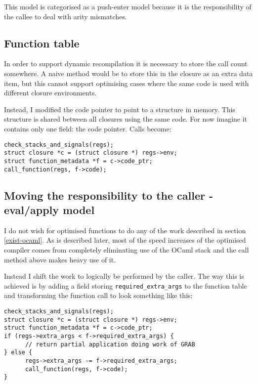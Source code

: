 This model is categorised as a push-enter model because it is the responsibility of the callee to
deal with arity mismatches.

\subsection{Function table}

In order to support dynamic recompilation it is necessary to store the call count somewhere. A
naive method would be to store this in the closure as an extra data item, but this cannot support
optimising cases where the same code is used with different closure environments.

Instead, I modified the code pointer to point to a structure in memory. This structure is shared
between all closures using the same code. For now imagine it contains only one field: the code
pointer. Calls become:

\begin{verbatim}
check_stacks_and_signals(regs);
struct closure *c = (struct closure *) regs->env;
struct function_metadata *f = c->code_ptr;
call_function(regs, f->code);
\end{verbatim}

\subsection{Moving the responsibility to the caller - eval/apply model}

I do not wish for optimised functions to do any of the work described in section \ref{exist-ocaml}.
As is described later, most of the speed increases of the optimised compiler comes from completely
eliminating use of the OCaml stack and the call method above makes heavy use of it.

Instead I shift the work to logically be performed by the caller. The way this is achieved is by
adding a
field storing \texttt{required\_extra\_args} to the function table and transforming the function
call to look something like this:

\begin{verbatim}
check_stacks_and_signals(regs);
struct closure *c = (struct closure *) regs->env;
struct function_metadata *f = c->code_ptr;
if (regs->extra_args < f->required_extra_args) {
      // return partial application doing work of GRAB
} else {
      regs->extra_args -= f->required_extra_args;
      call_function(regs, f->code);
}
\end{verbatim}

